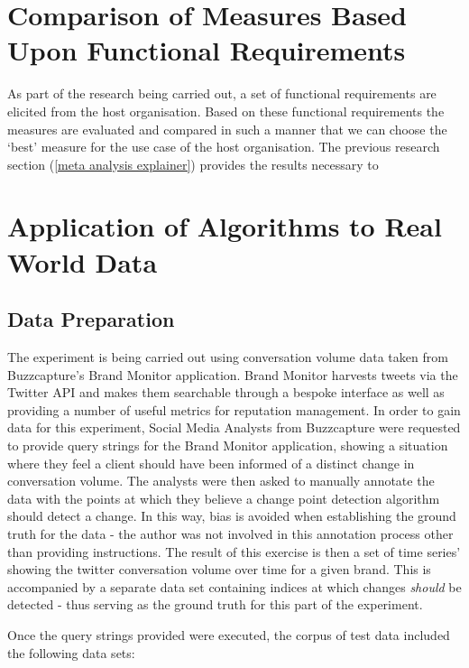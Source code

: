 \documentclass{uvamscse}	%
\begin{document}
\section{Comparison of Measures Based Upon Functional Requirements}

As part of the research being carried out, a set of functional requirements are elicited from the host organisation. Based on these functional requirements the measures are evaluated and compared in such a manner that we can choose the `best' measure for the use case of the host organisation. The previous research section (\autoref{meta analysis explainer}) provides the results necessary to 

\section{Application of Algorithms to Real World Data}
\label{real world explainer}

\subsection{Data Preparation}

The experiment is being carried out using conversation volume data taken from Buzzcapture's Brand Monitor application. Brand Monitor harvests tweets via the Twitter API and makes them searchable through a bespoke interface as well as providing a number of useful metrics for reputation management. In order to gain data for this experiment, Social Media Analysts from Buzzcapture were requested to provide query strings for the Brand Monitor application, showing a situation where they feel a client should have been informed of a distinct change in conversation volume. The analysts were then asked to manually annotate the data with the points at which they believe a change point detection algorithm should detect a change. In this way, bias is avoided when establishing the ground truth for the data - the author was not involved in this annotation process other than providing instructions. The result of this exercise is then a set of time series' showing the twitter conversation volume over time for a given brand. This is accompanied by a separate data set containing indices at which changes \emph{should} be detected - thus serving as the ground truth for this part of the experiment.

Once the query strings provided were executed, the corpus of test data included the following data sets:
\end{document}
